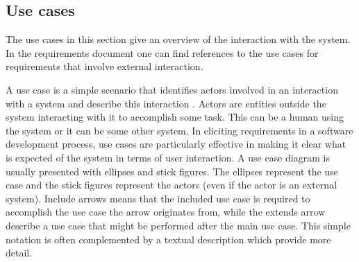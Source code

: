 \subsection{Use cases}
\label{subsec:use_cases}

The use cases in this section give an overview of the interaction with the system. In the requirements document one can find references to the use cases for requirements that involve external interaction.\newline

A use case is a simple scenario that identifies actors involved in an interaction with a system and describe this interaction \cite[p.106-107]{Sommerville}. Actors are entities outside the system interacting with it to accomplish some task. This can be a human using the system or it can be some other system. In eliciting requirements in a software development process, use cases are particularly effective in making it clear what is expected of the system in terms of user interaction. A use case diagram is usually presented with ellipses and stick figures. The ellipses represent the use case and the stick figures represent the actors (even if the actor is an external system). Include arrows means that the included use case is required to accomplish the use case the arrow originates from, while the extends arrow describe a use case that might be performed after the main use case. This simple notation is often complemented by a textual description which provide more detail.\newline

